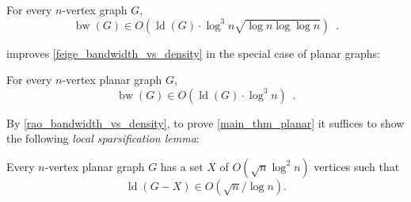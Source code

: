 \documentclass{patmorin}
\newcommand{\david}[1]{{\color{orange} David: #1}}
\newcommand{\pat}[1]{\textcolor{Blue}{Pat: #1}}
\newcommand{\defin}[1]{\emph{\textcolor{brightmaroon}{#1}}}
\DeclareMathOperator{\bw}{bw}
\DeclareMathOperator{\ld}{ld}
\begin{document}

\begin{thm}
\label{feige_bandwidth_vs_density}
  For every $n$-vertex graph $G$,
  \[
    \bw(G)\in O\left(\ld(G)\cdot \log^3 n\sqrt{\log n\log\log n}\right) \enspace .
  \]
\end{thm}

\citet{rao:small} improves \cref{feige_bandwidth_vs_density} in the special case of planar graphs:%

\begin{thm}
\label{rao_bandwidth_vs_density}
  For every $n$-vertex planar graph $G$,
  \[
    \bw(G)\in O\left(\ld(G)\cdot \log^3 n\right) \enspace .
  \]
\end{thm}

By \cref{rao_bandwidth_vs_density}, to prove \cref{main_thm_planar} it suffices to show the following \defin{local sparsification lemma}:

\begin{lem}\label{planar_sparsification_special}
  Every $n$-vertex planar graph $G$ has a set $X$ of $O(\sqrt{n}\log^2 n)$ vertices such that
  $$\ld(G-X)\in O(\sqrt{n}/\log n).$$
\end{lem}

\end{document}

